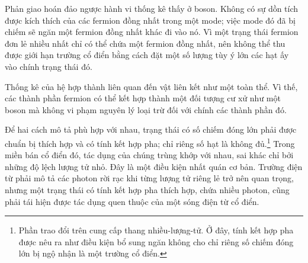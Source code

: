 Phản giao hoán đảo ngược hành vi thống kê thấy ở boson. Không có sự dồn tích được kích thích của các fermion đồng nhất trong một mode; việc mode đó đã bị chiếm sẽ ngăn một fermion đồng nhất khác đi vào nó. Vì một trạng thái fermion đơn lẻ nhiều nhất chỉ có thể chứa một fermion đồng nhất, nên không thể thu được giới hạn trường cổ điển bằng cách đặt một số lượng tùy ý lớn các hạt ấy vào chính trạng thái đó.

\begin{classroomqa}
\end{classroomqa}

Thống kê của hệ hợp thành liên quan đến vật liên kết như một toàn thể. Vì thế, các thành phần fermion có thể kết hợp thành một đối tượng cư xử như một boson mà không vi phạm nguyên lý loại trừ đối với chính các thành phần đó.

\begin{classroomqa}
\end{classroomqa}

Để hai cách mô tả phù hợp với nhau, trạng thái có số chiếm đóng lớn phải được chuẩn bị thích hợp và có tính kết hợp pha; chỉ riêng số hạt là không đủ.\footnote{Phần trao đổi trên cung cấp thang nhiều-lượng-tử. Ở đây, tính kết hợp pha được nêu ra như điều kiện bổ sung ngăn không cho chỉ riêng số chiếm đóng lớn bị ngộ nhận là một trường cổ điển.} Trong miền bán cổ điển đó, tác dụng của chúng trùng khớp với nhau, sai khác chỉ bởi những độ lệch lượng tử nhỏ. Đây là một điều kiện nhất quán cơ bản. Trường điện từ phải mô tả các photon rời rạc khi từng lượng tử riêng lẻ trở nên quan trọng, nhưng một trạng thái có tính kết hợp pha thích hợp, chứa nhiều photon, cũng phải tái hiện được tác dụng quen thuộc của một sóng điện từ cổ điển.
